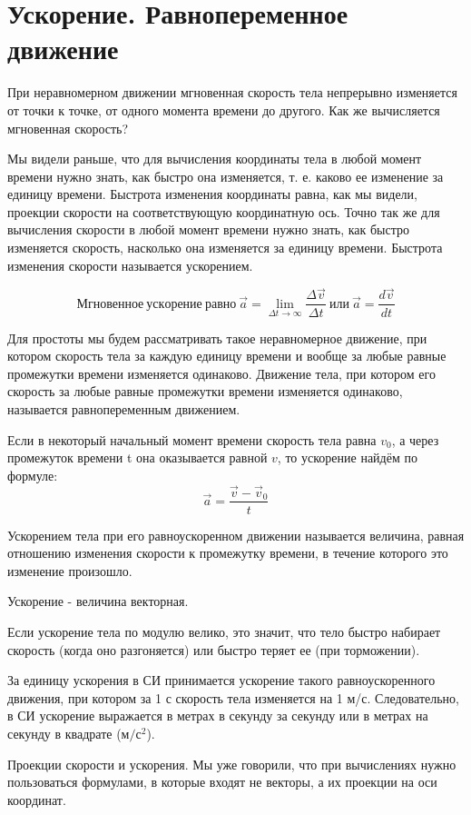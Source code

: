 \documentclass[a5paper, 10pt]{diss_4}
\renewcommand{\'}{\,'}
\begin{document}
\section{Ускорение. Равнопеременное движение}

  При неравномерном движении мгновенная скорость тела непрерывно
изменяется от точки к точке, от одного момента времени до другого. Как же
вычисляется мгновенная скорость?

  Мы видели раньше, что для вычисления координаты тела в любой момент
времени нужно знать, как быстро она изменяется, т. е. каково ее изменение за
единицу времени. Быстрота изменения координаты равна, как мы видели, проекции
скорости на соответствующую координатную ось. Точно так же для вычисления
скорости в любой момент времени нужно знать, как быстро изменяется скорость,
насколько она изменяется за единицу времени. Быстрота изменения скорости
называется ускорением.

\[Мгновенное\ ускорение\ равно\ \vec{a}=\lim_{\Delta t\to\infty}\frac{\Delta\vec{v}}{\Delta t}
\ или \ \vec{a}=\frac{d\vec{v}}{dt}
\]

  Для простоты мы будем рассматривать такое неравномерное движение, при
котором скорость тела за каждую единицу времени и вообще за любые равные
промежутки времени изменяется одинаково. Движение тела, при котором его
скорость за любые равные промежутки времени изменяется одинаково, называется
равнопеременным движением.

 Если в некоторый начальный момент времени скорость тела равна $v_0$, а через
промежуток времени t она оказывается равной $v$, то ускорение найдём по формуле:
\[\vec{a}=\frac{\vec{v}-\vec{v}_0}{t}\]


  Ускорением тела при его равноускоренном движении называется величина,
равная отношению изменения скорости к промежутку времени, в течение которого
это изменение произошло.

  Ускорение - величина векторная.

  Если ускорение тела по модулю велико, это значит, что тело быстро
набирает скорость (когда оно разгоняется) или быстро теряет ее (при торможении).

  За единицу ускорения в СИ принимается ускорение такого равноускоренного
движения, при котором за 1 с скорость тела изменяется на 1 м/с. Следовательно,
в СИ ускорение выражается в метрах в секунду за секунду или в метрах на секунду
в квадрате ($м/с^2$).

 Проекции скорости и ускорения. Мы уже говорили, что при вычислениях нужно
пользоваться формулами, в которые входят не векторы, а их проекции на оси
координат.
\end{document}
